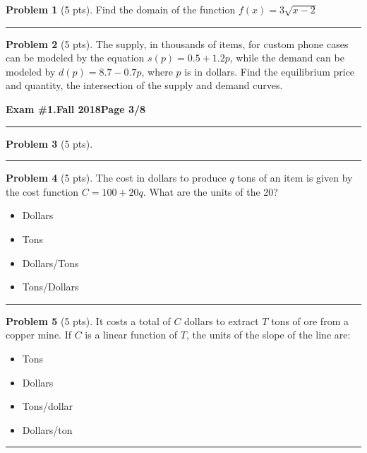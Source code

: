 \documentclass[12pt]{article}
\makeatletter
\theoremstyle{definition}
\newtheorem{problem}{Problem}
\newcommand*{\radiobutton}{%
  \@ifstar{\@radiobutton0}{\@radiobutton1}%
}
\newcommand*{\@radiobutton}[1]{%
  \begin{tikzpicture}
    \pgfmathsetlengthmacro\radius{height("X")/2}
    \draw[radius=\radius] circle;
    \ifcase#1 \fill[radius=.6*\radius] circle;\fi
  \end{tikzpicture}%
}
\makeatother
\begin{document}
\begin{problem}[5 pts]
  Find the domain of the function $f(x) = 3\sqrt{x-2}$

  \vspace{2cm}
\end{problem}
\hrule

\begin{problem}[5 pts]
  The supply, in thousands of items, for custom phone cases can be modeled by the equation $s(p)=0.5+1.2p$, while the
  demand can be modeled by $d(p) = 8.7 - 0.7p$, where $p$ is in dollars.  Find the equilibrium price and quantity, the
  intersection of the supply and demand curves.
\end{problem}

\newpage

\hfill{\large\bf Exam \#1.}\hfill{\large\bf  Fall 2018}\hfill{\large\bf Page 3/8}\hrule

\bigskip
\begin{problem}[5 pts]
  
\end{problem}
\hrule

\begin{problem}[5 pts]
  The cost in dollars to produce $q$ tons of an item is given by the cost function $C = 100 + 20q$. What are the units of
  the 20? 
  \begin{itemize}
  \item[\radiobutton] Dollars
  \item[\radiobutton] Tons
  \item[\radiobutton] Dollars/Tons
  \item[\radiobutton] Tons/Dollars
  \end{itemize} 
\end{problem}
\hrule


\begin{problem}[5 pts]
  It costs a total of $C$ dollars to extract $T$ tons of ore from a copper mine. If $C$ is a linear function of $T$, the
  units of the slope of the line are: 
  \begin{itemize}
  \item[\radiobutton] Tons
  \item[\radiobutton] Dollars
  \item[\radiobutton] Tons/dollar
  \item[\radiobutton] Dollars/ton
  \end{itemize}
\end{problem}
\hrule
\end{document}
